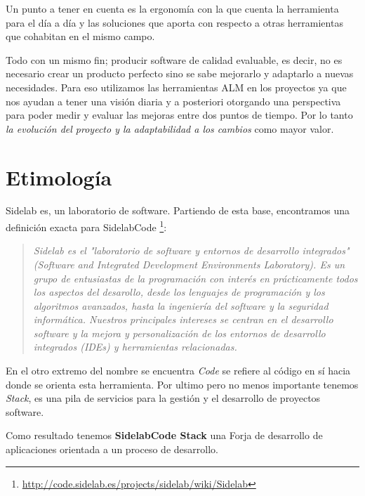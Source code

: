 \par Un punto a tener en cuenta es la ergonom\'ia con la que cuenta la herramienta para el d\'ia a d\'ia y las soluciones que aporta con respecto a otras herramientas que cohabitan en el mismo campo.

\par Todo con un mismo fin; producir software de calidad evaluable, es decir, no es necesario crear un producto perfecto sino se sabe mejorarlo y adaptarlo a nuevas necesidades. Para eso utilizamos las herramientas ALM en los proyectos ya que nos ayudan a tener una visi\'on diaria y a posteriori otorgando una perspectiva para poder medir y evaluar las mejoras entre dos puntos de tiempo. Por lo tanto \emph{la evoluci\'on del proyecto y la adaptabilidad a los cambios} como mayor valor.

\section{Etimolog\'ia}
\label{sec:etimologia}

\par Sidelab es, un laboratorio de software. Partiendo de esta base, encontramos una definici\'on exacta para SidelabCode \footnote{\url{http://code.sidelab.es/projects/sidelab/wiki/Sidelab}}:

\begin{quotation}
        \emph{Sidelab es el "laboratorio de software y entornos de desarrollo integrados" (Software and Integrated Development Environments Laboratory). Es un grupo de entusiastas de la programaci\'on con inter\'es en pr\'acticamente todos los aspectos del desarollo, desde los lenguajes de programaci\'on y los algoritmos avanzados, hasta la ingenier\'ia del software y la seguridad inform\'atica. Nuestros principales intereses se centran en el desarrollo software y la mejora y personalizaci\'on de los entornos de desarrollo integrados (IDEs) y herramientas relacionadas.}
\end{quotation}

\par En el otro extremo del nombre se encuentra \emph{Code} se refiere al c\'odigo en s\'i hacia donde se orienta esta herramienta. Por ultimo pero no menos importante tenemos \emph{Stack}, es una pila de servicios para la gesti\'on y el desarrollo de proyectos software.

\par Como resultado tenemos \textbf{SidelabCode Stack} una Forja de desarrollo de aplicaciones orientada a un proceso de desarrollo.

